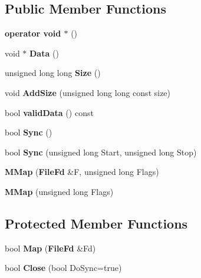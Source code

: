 \subsection*{\-Public \-Member \-Functions}
\begin{DoxyCompactItemize}
\item 
{\bfseries operator void $\ast$} ()\label{classMMap_a0b32021b12206ef34495c688760c44bf}

\item 
void $\ast$ {\bfseries \-Data} ()\label{classMMap_ab53592c09a03bd22f28279f270a035ee}

\item 
unsigned long long {\bfseries \-Size} ()\label{classMMap_aed932b1aeb338009c8390f5322ac228a}

\item 
void {\bfseries \-Add\-Size} (unsigned long long const size)\label{classMMap_a07375fc384c32d1c5bc19ba031fb4395}

\item 
bool {\bfseries valid\-Data} () const \label{classMMap_a762d156a1c7b8db2bd734155730ddbbc}

\item 
bool {\bfseries \-Sync} ()\label{classMMap_a071d010e76ac762ffab420fcf90656a4}

\item 
bool {\bfseries \-Sync} (unsigned long \-Start, unsigned long \-Stop)\label{classMMap_a7104a90fd798326a13f268a806a3e198}

\item 
{\bfseries \-M\-Map} ({\bf \-File\-Fd} \&\-F, unsigned long \-Flags)\label{classMMap_ada3c6c0c38c283795f1666925047e63f}

\item 
{\bfseries \-M\-Map} (unsigned long \-Flags)\label{classMMap_a8d12a114ce9e6312211aaed8fd905f57}

\end{DoxyCompactItemize}
\subsection*{\-Protected \-Member \-Functions}
\begin{DoxyCompactItemize}
\item 
bool {\bfseries \-Map} ({\bf \-File\-Fd} \&\-Fd)\label{classMMap_abf6208ba8fc33da8217ee57b919c1892}

\item 
bool {\bfseries \-Close} (bool \-Do\-Sync=true)\label{classMMap_a3339fc07ccce858f61987c5940057ac2}

\end{DoxyCompactItemize}
